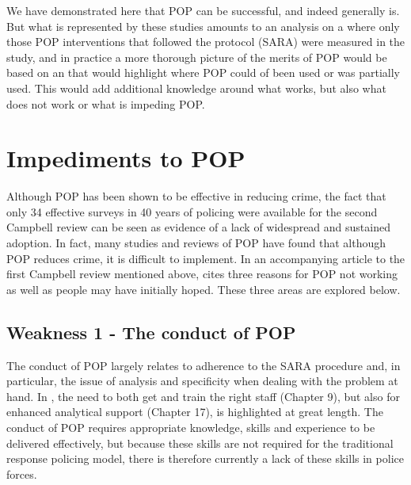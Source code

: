 We have demonstrated here that POP can be successful, and indeed generally is. But what is represented by these studies amounts to an analysis on a  where only those POP interventions that followed the protocol (SARA) were measured in the study, and in practice a more thorough picture of the merits of POP would be based on an  that would highlight where POP could of been used or was partially used. This would add additional knowledge around what works, but also what does not work or what is impeding POP. 


\section{Impediments to POP} 



Although POP has been shown to be effective in reducing crime, the fact that only 34 effective surveys in 40 years of policing were available for the second Campbell review can be seen as evidence of a lack of widespread and sustained adoption. In fact, many studies and reviews of POP have found that although POP reduces crime, it is difficult to implement. In an accompanying article to the first Campbell review mentioned above, \textcite{whitherpop} cites three reasons for POP not working as well as people may have initially hoped. These three areas are explored below.



\subsection{Weakness 1 - The conduct of POP}  



The conduct of POP largely relates to adherence to the SARA procedure and, in particular, the issue of analysis and specificity when dealing with the problem at hand. In  \textcite{scott2012implementing}, the need to both get and train the right staff (Chapter 9), but also for enhanced analytical support (Chapter 17), is highlighted at great length. The conduct of POP requires appropriate knowledge, skills and experience to be delivered effectively, but because these skills are not required for the traditional response policing model, there is therefore currently a lack of these skills in police forces.

